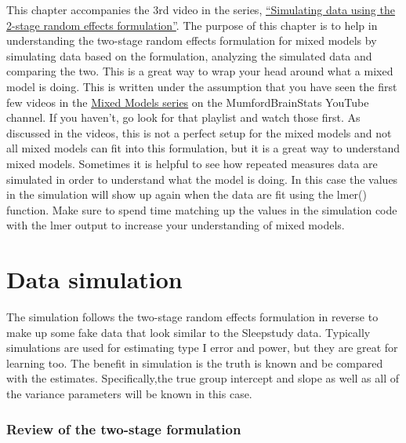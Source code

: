 \documentclass[
]{book}
\begin{document}
This chapter accompanies the 3rd video in the series, \href{https://youtu.be/OL6UezgpmPo}{``Simulating data using the 2-stage random effects formulation''}. The purpose of this chapter is to help in understanding the two-stage random effects formulation for mixed models by simulating data based on the formulation, analyzing the simulated data and comparing the two. This is a great way to wrap your head around what a mixed model is doing. This is written under the assumption that you have seen the first few videos in the \href{https://www.youtube.com/watch?v=IGHm1XHFWMc\&list=PLB2iAtgpI4YEAUiEQ1ZnfMXY-yewNzn9z}{Mixed Models series} on the MumfordBrainStats YouTube channel. If you haven't, go look for that playlist and watch those first. As discussed in the videos, this is not a perfect setup for the mixed models and not all mixed models can fit into this formulation, but it is a great way to understand mixed models. Sometimes it is helpful to see how repeated measures data are simulated in order to understand what the model is doing. In this case the values in the simulation will show up again when the data are fit using the lmer() function. Make sure to spend time matching up the values in the simulation code with the lmer output to increase your understanding of mixed models.

\hypertarget{data-simulation}{%
\section*{Data simulation}\label{data-simulation}}

The simulation follows the two-stage random effects formulation in reverse to make up some fake data that look similar to the Sleepstudy data. Typically simulations are used for estimating type I error and power, but they are great for learning too. The benefit in simulation is the truth is known and be compared with the estimates. Specifically,the true group intercept and slope as well as all of the variance parameters will be known in this case.

\hypertarget{review-of-the-two-stage-formulation}{%
\subsubsection*{Review of the two-stage formulation}\label{review-of-the-two-stage-formulation}}
\end{document}
